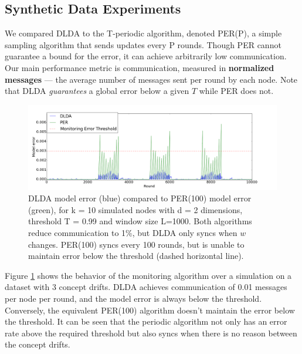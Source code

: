 \documentclass[11pt,twocolumn,varwidth=true,a4paper,fleqn]{article}
\begin{document}
\subsection{Synthetic Data Experiments}
We compared DLDA to the T-periodic algorithm, denoted
PER(P), a simple sampling algorithm that sends updates
every P rounds. Though PER cannot guarantee a bound for the
error, it can achieve arbitrarily low communication.
Our main performance metric is communication, measured
in \textbf{normalized messages} --- the average number of messages sent per
round by each node. Note that DLDA \textit{guarantees}
a global error below a given $T$ while PER does not.

\begin{figure}[ht]
	\centering
	\includegraphics[width=\textwidth]{PER/PERvsDLDAoverTime.png}
	\caption{ DLDA model error (blue) compared to PER(100) model error (green), 
	for k = 10 simulated nodes with d = 2 dimensions, threshold T = 0.99 and
	window size L=1000. Both algorithms reduce communication to 1\%, but DLDA
	only syncs when $w$ changes. PER(100) syncs every 100 rounds, 
	but is unable to maintain error below the threshold (dashed horizontal line).}
	\label{PERvsDLDAoverTime}
\end{figure}
	
Figure \ref{PERvsDLDAoverTime} shows the behavior of the monitoring 
algorithm over a simulation on a dataset with 3 concept drifts. 
DLDA achieves communication of 0.01 messages per node per round, and 
the model error is always below the threshold. 
Conversely, the equivalent PER(100) algorithm doesn't maintain the
error below the threshold. It can be seen that the periodic algorithm 
not only has an error rate above the required threshold but also
syncs when there is no reason between the concept drifts.
\end{document}
